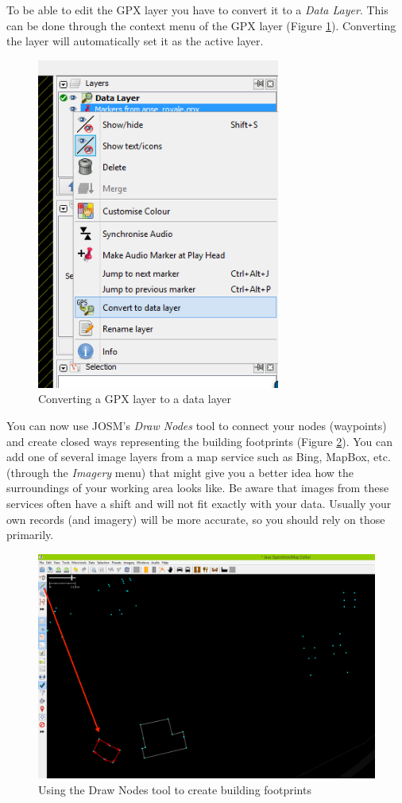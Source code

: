 \documentclass[a4paper,12pt,titlepage]{article}
\begin{document}
To be able to edit the GPX layer you have to convert it to a \textit{Data Layer}. This can be done through the context menu of the GPX layer (Figure \ref{fig:load_gpx_4}). Converting the layer will automatically set it as the active layer.

\begin{figure}[H]
	\centering
	\includegraphics[width=8cm]{Images/load_gpx_file_4.png}
	\caption{Converting a GPX layer to a data layer}\label{fig:load_gpx_4}
\end{figure}

You can now use JOSM's \textit{Draw Nodes} tool to connect your nodes (waypoints) and create closed ways representing the building footprints (Figure \ref{fig:load_gpx_5}). You can add one of several image layers from a map service such as Bing, MapBox, etc. (through the \textit{Imagery} menu) that might give you a better idea how the surroundings of your working area looks like. Be aware that images from these services often have a shift and will not fit exactly with your data. Usually your own records (and imagery) will be more accurate, so you should rely on those primarily. 

\begin{figure}[H]
	\centering
	\includegraphics[width=12cm]{Images/load_gpx_file_5.png}
	\caption{Using the Draw Nodes tool to create building footprints}\label{fig:load_gpx_5}
\end{figure}
\end{document}
